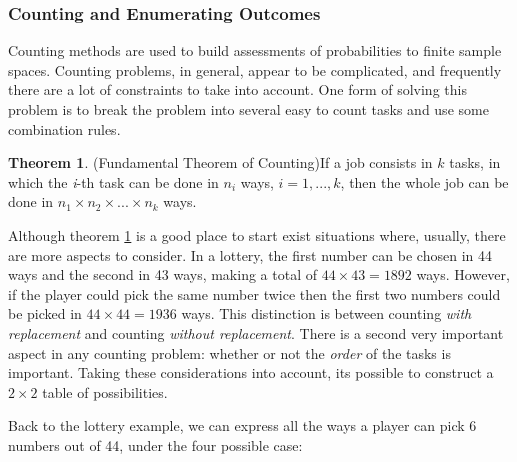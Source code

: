 \documentclass[
  oneside,
  11pt, a4paper,
  footinclude=true,
  headinclude=true,
  cleardoublepage=empty
]{scrbook}
\theoremstyle{definition}
\theoremstyle{definition}
\newtheorem{theorem}{Theorem}[section]
\begin{document}
        \subsubsection{Counting and Enumerating Outcomes}
        
        Counting methods are used to build assessments of probabilities to finite sample spaces. Counting problems, in general, appear to be complicated, and frequently there are a lot of constraints to take into account. One form of solving this problem is to break the problem into several easy to count tasks and use some combination rules.
        
        \begin{theorem}{(Fundamental Theorem of Counting)}\label{t-2-1-5}
            If a job consists in $k$ tasks, in which the \emph{i}-th task can be done in $n_i$ ways, $i = 1,...,k$, then the whole job can be done in $n_1 \times n_2 \times ... \times n_k$ ways.
        \end{theorem}{}
        
        Although theorem \ref{t-2-1-5} is a good place to start exist situations where, usually, there are more aspects to consider. In a lottery, the first number can be chosen in 44 ways and the second in 43 ways, making a total of $44 \times 43 = 1892$ ways. However, if the player could pick the same number twice then the first two numbers could be picked in $44 \times 44 = 1936$ ways. This distinction is between counting \emph{with replacement} and counting \emph{without replacement}. There is a second very important aspect in any counting problem: whether or not the \emph{order} of the tasks is important. Taking these considerations into account, its possible to construct a $2 \times 2$ table of possibilities.
        
        Back to the lottery example, we can express all the ways a player can pick 6 numbers out of 44, under the four possible case:
        
\end{document}
